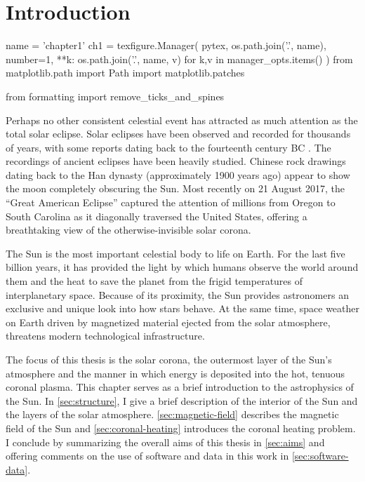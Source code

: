\chapter{Introduction}\label{ch:introduction}

\begin{pycode}[chapter1]
name = 'chapter1'
ch1 = texfigure.Manager(
    pytex,
    os.path.join('.', name),
    number=1,
    **{k: os.path.join('.', name, v) for k,v in manager_opts.items()}
)
from matplotlib.path import Path
import matplotlib.patches

from formatting import remove_ticks_and_spines
\end{pycode}

Perhaps no other consistent celestial event has attracted as much attention as the total solar eclipse. Solar eclipses have been observed and recorded for thousands of years, with some reports dating back to the fourteenth century BC \citep{golub_solar_2010}. The recordings of ancient eclipses have been heavily studied. Chinese rock drawings dating back to the Han dynasty (approximately 1900 years ago) appear to show the moon completely obscuring the Sun. Most recently on 21 August 2017, the ``Great American Eclipse'' captured the attention of millions from Oregon to South Carolina as it diagonally traversed the United States, offering a breathtaking view of the otherwise-invisible solar corona. 

The Sun is the most important celestial body to life on Earth. For the last five billion years, it has provided the light by which humans observe the world around them and the heat to save the planet from the frigid temperatures of interplanetary space. Because of its proximity, the Sun provides astronomers an exclusive and unique look into how stars behave. At the same time, space weather on Earth driven by magnetized material ejected from the solar atmosphere, threatens modern technological infrastructure.

The focus of this thesis is the solar corona, the outermost layer of the Sun's atmosphere and the manner in which energy is deposited into the hot, tenuous coronal plasma. This chapter serves as a brief introduction to the astrophysics of the Sun. In \autoref{sec:structure}, I give a brief description of the interior of the Sun and the layers of the solar atmosphere. \autoref{sec:magnetic-field} describes the magnetic field of the Sun and \autoref{sec:coronal-heating} introduces the coronal heating problem. I conclude by summarizing the overall aims of this thesis in \autoref{sec:aims} and offering comments on the use of software and data in this work in \autoref{sec:software-data}.

